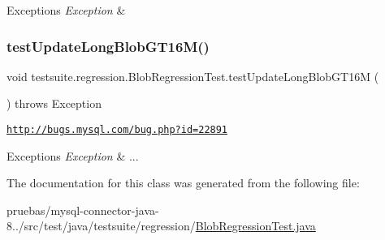 \begin{DoxyExceptions}{Exceptions}
{\em Exception} & \\
\hline
\end{DoxyExceptions}
\mbox{\label{classtestsuite_1_1regression_1_1_blob_regression_test_a25e07d454d6ad14097ae4b5c5b1bab10}} 
\subsubsection{\texorpdfstring{test\+Update\+Long\+Blob\+G\+T16\+M()}{testUpdateLongBlobGT16M()}}
{\footnotesize\ttfamily void testsuite.\+regression.\+Blob\+Regression\+Test.\+test\+Update\+Long\+Blob\+G\+T16M (\begin{DoxyParamCaption}{ }\end{DoxyParamCaption}) throws Exception}

\href{http://bugs.mysql.com/bug.php?id=22891}{\tt http\+://bugs.\+mysql.\+com/bug.\+php?id=22891}


\begin{DoxyExceptions}{Exceptions}
{\em Exception} & ... \\
\hline
\end{DoxyExceptions}


The documentation for this class was generated from the following file\+:\begin{DoxyCompactItemize}
\item 
pruebas/mysql-\/connector-\/java-\/8../src/test/java/testsuite/regression/\mbox{\hyperlink{_blob_regression_test_8java}{Blob\+Regression\+Test.\+java}}\end{DoxyCompactItemize}

